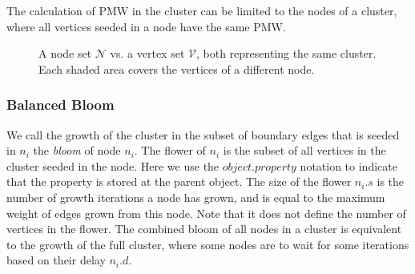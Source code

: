 \begin{lemma}
  The calculation of PMW in the cluster can be limited to the nodes of a cluster, where all vertices seeded in a node have the same PMW.
\end{lemma}

\begin{figure}
 \centering
  \caption{A node set $\mathcal{N}$ vs. a vertex set $\mathcal{V}$, both representing the same cluster. Each shaded area covers the vertices of a different  node.}\label{fig:nodesetpmw}
\end{figure}

\subsubsection{Balanced Bloom}

We call the growth of the cluster in the subset of boundary edges that is seeded in $n_i$ the \emph{bloom} of node $n_i$. The flower of $n_i$ is the subset of all vertices in the cluster seeded in the node. Here we use the $object.property$ notation to indicate that the property is stored at the parent object. The size of the flower $n_i.s$ is the number of growth iterations a node has grown, and is equal to the maximum weight of edges grown from this node. Note that it does not define the number of vertices in the flower. The combined bloom of all nodes in a cluster is equivalent to the growth of the full cluster, where some nodes are to wait for some iterations based on their delay $n_i.d$.

